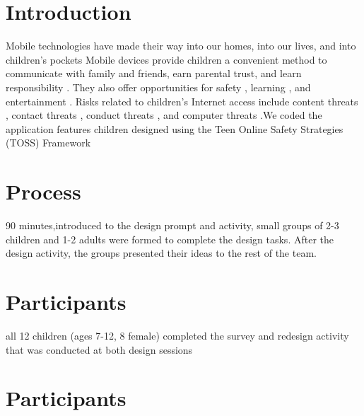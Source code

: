 \section{Introduction}
 Mobile technologies have made their way into our homes, into our lives, and into children’s pockets 
Mobile devices provide children a convenient method to communicate with family and friends, 
earn parental trust, and learn responsibility . They also offer opportunities for safety , 
learning , and entertainment .  Risks related to children’s Internet access include content threats , 
contact threats , conduct threats , and computer threats .We coded the application features children 
designed using the Teen Online Safety Strategies (TOSS) Framework 

\section{Process}
90 minutes,introduced to the design prompt and activity, small groups of 2-3 children 
and 1-2 adults were formed to complete the design tasks. 
After the design activity, the groups presented their ideas to the rest of the team. 

\section{Participants}
all 12 children (ages 7-12, 8 female) completed the survey and redesign activity that was conducted at both design sessions

\section{Participants}

